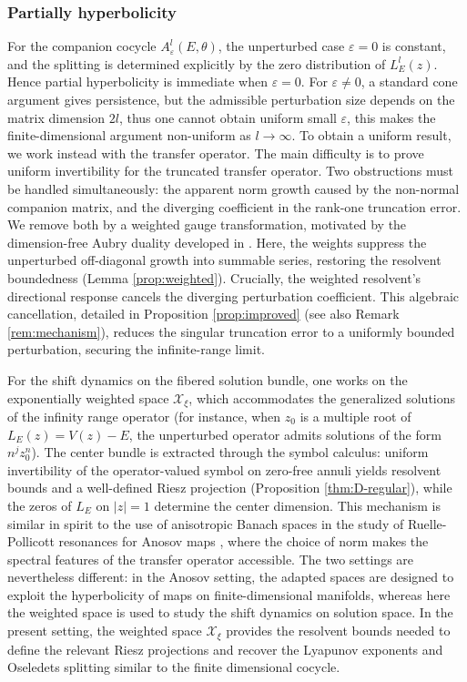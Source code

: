 \documentclass[reqno,11pt]{amsart}
\begin{document}
\subsubsection{Partially hyperbolicity}
For the companion cocycle $A^l_{\varepsilon}(E,\theta)$, the unperturbed case $\varepsilon=0$ is constant, and the splitting is determined explicitly by the zero distribution of $L_E^l(z)$. Hence partial hyperbolicity is immediate when $\varepsilon=0$. For $\varepsilon\neq 0$, a standard cone argument gives persistence, but the admissible perturbation size depends on the matrix dimension $2l$, thus one cannot obtain uniform small $\varepsilon$, this makes the finite-dimensional argument non-uniform as $l\to\infty$. To obtain a uniform result, we work instead with the transfer operator.
The main difficulty is to prove uniform invertibility for the truncated transfer operator. Two obstructions must be handled simultaneously: the apparent norm growth caused by the non-normal companion matrix, and the diverging coefficient in the rank-one truncation error. We remove both by a weighted gauge transformation, motivated by the dimension-free Aubry duality developed in \cite[Section~7]{LXZ}. Here, the weights suppress the unperturbed off-diagonal growth into summable series, restoring the resolvent boundedness (Lemma \ref{prop:weighted}). Crucially, the weighted resolvent's directional response  cancels the diverging perturbation coefficient. This  algebraic cancellation, detailed in Proposition \ref{prop:improved} (see also Remark \ref{rem:mechanism}), reduces the singular truncation error to a uniformly bounded perturbation, securing the infinite-range limit.



For the shift dynamics on the fibered solution bundle, one works on the exponentially weighted space $\mathcal X_\xi$, which accommodates the generalized solutions of the infinity range operator (for instance, when $z_0$ is a multiple
root of $L_E(z)=V(z)-E$, the unperturbed operator admits solutions of the form
$n^jz_0^n$).
The center bundle is extracted through the symbol calculus: uniform invertibility of the operator-valued symbol on zero-free annuli yields resolvent bounds and a well-defined Riesz projection (Proposition \ref{thm:D-regular}), while the zeros of $L_E$ on $|z|=1$ determine the center dimension.
This mechanism is similar in spirit to the use of anisotropic Banach spaces in the study of Ruelle-Pollicott resonances \cite{Rulle,Pollicott} for Anosov maps \cite{Baladi,BKL,Faure}, where the choice of norm makes the spectral features of the transfer operator accessible. The two settings are nevertheless different: in the Anosov setting, the adapted spaces are designed to exploit
the hyperbolicity of maps on finite-dimensional manifolds,
whereas here the weighted space is used to study the shift dynamics on solution space. In the present setting, the weighted space $\mathcal X_\xi$ provides the resolvent bounds needed to define the relevant Riesz projections and recover the Lyapunov exponents and Oseledets splitting similar to the finite dimensional cocycle.
\end{document}
